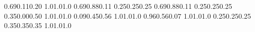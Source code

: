 \documentclass[a5paper,9pt]{scrreprt}
\begin{document}
\thispagestyle{empty}

\setslotsize{4.44cm}{0.203cm}
\settextframe{0.8mm}

\seteventcornerradius{0pt}


  {0.69}{0.11}{0.20}   {1.0}{1.0}{1.0}  %
  {0.69}{0.88}{0.11}   {0.25}{0.25}{0.25}  %
 {0.69}{0.88}{0.11}   {0.25}{0.25}{0.25}  %
 {0.35}{0.00}{0.50}   {1.0}{1.0}{1.0}  %
     {0.09}{0.45}{0.56}   {1.0}{1.0}{1.0}  %
 {0.96}{0.56}{0.07}   {1.0}{1.0}{1.0}  %
   {0.25}{0.25}{0.25}  %
     {0.35}{0.35}{0.35}   {1.0}{1.0}{1.0}  %
\end{document}
